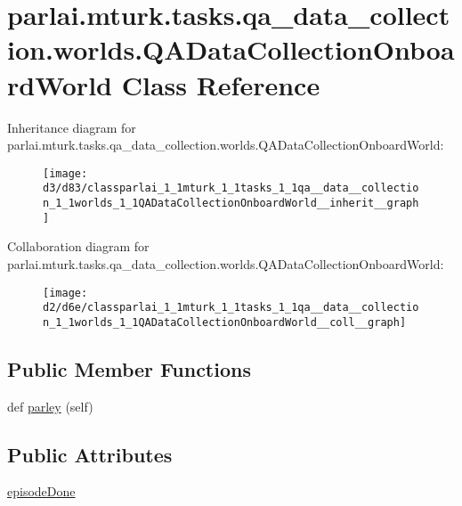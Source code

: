 \hypertarget{classparlai_1_1mturk_1_1tasks_1_1qa__data__collection_1_1worlds_1_1QADataCollectionOnboardWorld}{}\section{parlai.\+mturk.\+tasks.\+qa\+\_\+data\+\_\+collection.\+worlds.\+Q\+A\+Data\+Collection\+Onboard\+World Class Reference}
\label{classparlai_1_1mturk_1_1tasks_1_1qa__data__collection_1_1worlds_1_1QADataCollectionOnboardWorld}


Inheritance diagram for parlai.\+mturk.\+tasks.\+qa\+\_\+data\+\_\+collection.\+worlds.\+Q\+A\+Data\+Collection\+Onboard\+World\+:\nopagebreak
\begin{figure}[H]
\begin{center}
\leavevmode
\texttt{[image: d3/d83/classparlai\_1\_1mturk\_1\_1tasks\_1\_1qa\_\_data\_\_collection\_1\_1worlds\_1\_1QADataCollectionOnboardWorld\_\_inherit\_\_graph]}
\end{center}
\end{figure}


Collaboration diagram for parlai.\+mturk.\+tasks.\+qa\+\_\+data\+\_\+collection.\+worlds.\+Q\+A\+Data\+Collection\+Onboard\+World\+:\nopagebreak
\begin{figure}[H]
\begin{center}
\leavevmode
\texttt{[image: d2/d6e/classparlai\_1\_1mturk\_1\_1tasks\_1\_1qa\_\_data\_\_collection\_1\_1worlds\_1\_1QADataCollectionOnboardWorld\_\_coll\_\_graph]}
\end{center}
\end{figure}
\subsection*{Public Member Functions}
\begin{DoxyCompactItemize}
\item 
def \hyperlink{classparlai_1_1mturk_1_1tasks_1_1qa__data__collection_1_1worlds_1_1QADataCollectionOnboardWorld_a2cbf0247b9bf28187bbfe164082ec5fb}{parley} (self)
\end{DoxyCompactItemize}
\subsection*{Public Attributes}
\begin{DoxyCompactItemize}
\item 
\hyperlink{classparlai_1_1mturk_1_1tasks_1_1qa__data__collection_1_1worlds_1_1QADataCollectionOnboardWorld_ac4db38f49dc8de63c95ca6049bf61ebb}{episode\+Done}
\end{DoxyCompactItemize}


